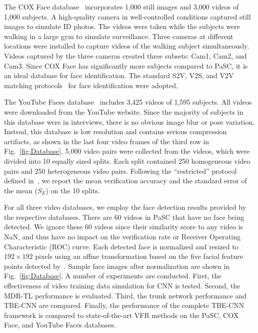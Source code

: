 \documentclass[10pt,journal,cspaper,compsoc]{IEEEtran}
\begin{document}
The COX Face database~\cite{Huang2015Benchmark} incorporates 1,000 still images and 3,000 videos of 1,000 subjects.
A high-quality camera in well-controlled conditions captured still images to simulate ID photos.
The videos were taken while the subjects were walking in a large gym to simulate surveillance.
Three cameras at different locations were installed to capture videos of the walking subject simultaneously.
Videos captured by the three cameras created three subsets: Cam1, Cam2, and Cam3.
Since COX Face has significantly more subjects compared to PaSC, it is an ideal database for face identification.
The standard S2V, V2S, and V2V matching protocols~\cite{Huang2015Benchmark} for face identification were adopted.

The YouTube Faces database~\cite{wolf2011face} includes 3,425 videos of 1,595 subjects.
All videos were downloaded from the YouTube website.
Since the majority of subjects in this database were in interviews, there is no obvious image blur or pose variation.
Instead, this database is low resolution and contains serious compression artifacts, as shown in the last four video frames of the third row in Fig.~\ref{fig:Database}.
5,000 video pairs were collected from the videos, which were divided into 10 equally sized splits.
Each split contained 250 homogeneous video pairs and 250 heterogeneous video pairs.
Following the ``restricted'' protocol defined in~\cite{wolf2011face}, we report the mean verification accuracy and the standard error of the mean ($S_{E}$) on the 10 splits.

For all three video databases, we employ the face detection results provided by the respective databases.
There are 60 videos in PaSC that have no face being detected. We ignore these 60 videos since their similarity score to any video is NaN,
and thus have no impact on the verification rate or Receiver Operating Characteristic (ROC) curve.
Each detected face is normalized and resized to $192\times192$ pixels using an affine transformation based on the five facial feature points detected by~\cite{sun2013deep}.
Sample face images after normalization are shown in Fig.~\ref{fig:Database}.
A number of experiments are conducted. First, the effectiveness of video training data simulation for CNN is tested.
Second, the MDR-TL performance is evaluated.
Third, the trunk network performance and TBE-CNN are compared.
Finally, the performance of the complete TBE-CNN framework is compared to state-of-the-art VFR methods on the PaSC, COX Face, and YouTube Faces databases.
\end{document}
